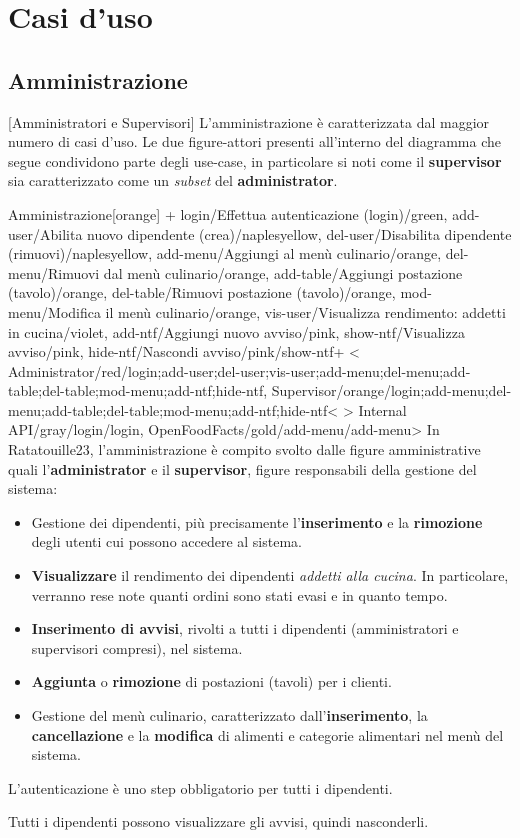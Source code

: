 \section{Casi d'uso}
\subsection{Amministrazione}[Amministratori e Supervisori]
	L'amministrazione è caratterizzata dal maggior numero di casi d'uso. Le due figure-attori presenti
	all'interno del diagramma che segue condividono parte degli use-case, in particolare si noti
	come il \textbf{supervisor} sia caratterizzato come un \textit{subset} del \textbf{administrator}.

	\begin{ddusecase}{Amministrazione}[orange]
		+	{login/Effettua autenticazione (login)/green},
			{add-user/Abilita nuovo dipendente (crea)/naplesyellow},
			{del-user/Disabilita dipendente (rimuovi)/naplesyellow},
			{add-menu/Aggiungi al menù culinario/orange},
			{del-menu/Rimuovi dal menù culinario/orange},
			{add-table/Aggiungi postazione (tavolo)/orange},
			{del-table/Rimuovi postazione (tavolo)/orange},
			{mod-menu/Modifica il menù culinario/orange},
			{vis-user/Visualizza rendimento: addetti in cucina/violet},
			{add-ntf/Aggiungi nuovo avviso/pink},
			{show-ntf/Visualizza avviso/pink},
			{hide-ntf/Nascondi avviso/pink/show-ntf}+
		<	{Administrator/red/login;add-user;del-user;vis-user;add-menu;del-menu;add-table;del-table;mod-menu;add-ntf;hide-ntf},
			{Supervisor/orange/login;add-menu;del-menu;add-table;del-table;mod-menu;add-ntf;hide-ntf}<
		> {Internal API/gray/login/login},
			{OpenFoodFacts/gold/add-menu/add-menu}>
		In Ratatouille23, l'amministrazione è compito svolto dalle figure amministrative quali l'\textbf{administrator} e il \textbf{supervisor}, figure responsabili della gestione del sistema:
		\begin{itemize}
			\item Gestione dei dipendenti, più precisamente l'\textbf{inserimento} e la \textbf{rimozione} degli utenti cui possono accedere al sistema.
			\item \textbf{Visualizzare} il rendimento dei dipendenti \textit{addetti alla cucina}. In particolare, verranno rese note quanti ordini sono stati evasi e in quanto tempo.
			\item \textbf{Inserimento di avvisi}, rivolti a tutti i dipendenti (amministratori e supervisori compresi), nel sistema.
			\item \textbf{Aggiunta} o \textbf{rimozione} di postazioni (tavoli) per i clienti.
			\item Gestione del menù culinario, caratterizzato dall'\textbf{inserimento}, la \textbf{cancellazione} e la \textbf{modifica} di alimenti e categorie alimentari nel menù del sistema.
		\end{itemize}

		L'autenticazione è uno step obbligatorio per tutti i dipendenti.

		Tutti i dipendenti possono visualizzare gli avvisi, quindi nasconderli. 
	\end{ddusecase}

